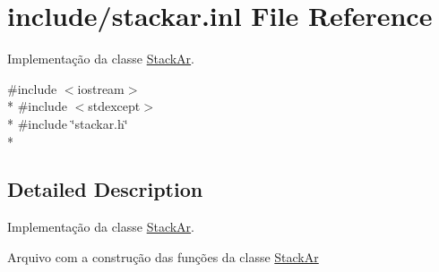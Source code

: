 \hypertarget{stackar_8inl}{}\section{include/stackar.inl File Reference}
\label{stackar_8inl}


Implementação da classe \hyperlink{class_stack_ar}{Stack\+Ar}.  


{\ttfamily \#include $<$iostream$>$}\\*
{\ttfamily \#include $<$stdexcept$>$}\\*
{\ttfamily \#include \char`\"{}stackar.\+h\char`\"{}}\\*


\subsection{Detailed Description}
Implementação da classe \hyperlink{class_stack_ar}{Stack\+Ar}. 

Arquivo com a construção das funções da classe \hyperlink{class_stack_ar}{Stack\+Ar} 